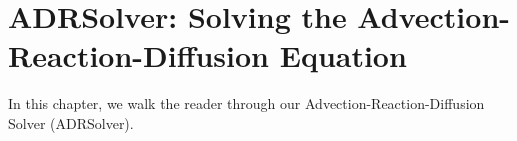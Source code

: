 \chapter{ADRSolver: Solving the Advection-Reaction-Diffusion Equation}

In this chapter, we walk the reader through our Advection-Reaction-Diffusion Solver (ADRSolver).

